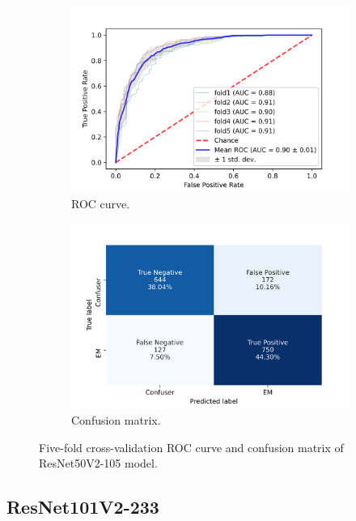 \begin{figure}[h!]
	\centering
	\begin{subfigure}[b]{0.49\textwidth}
		\centering
		\includegraphics[width=\textwidth,keepaspectratio]{images/Supplement4/image83.png}
		\caption{ROC curve.}
	\end{subfigure}
	\hfill
	\begin{subfigure}[b]{0.49\textwidth}
		\centering
		\includegraphics[width=\textwidth,keepaspectratio]{images/Supplement4/image89.png}
		\caption{Confusion matrix.}
	\end{subfigure}
	\caption{Five-fold cross-validation ROC curve and confusion matrix of ResNet50V2-105 model.}
\end{figure}


\vfill\clearpage
\subsection{ResNet101V2-233}

